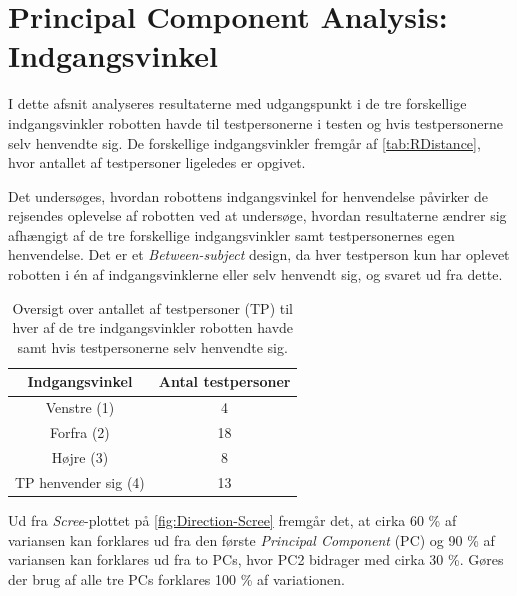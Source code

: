 \section{Principal Component Analysis: Indgangsvinkel}
\label{DatabehandlingRIndgangsvinkel}
%
I dette afsnit analyseres resultaterne med udgangspunkt i de tre forskellige indgangsvinkler robotten havde til testpersonerne i testen og hvis testpersonerne selv henvendte sig. De forskellige indgangsvinkler fremgår af \autoref{tab:RDistance}, hvor antallet af testpersoner ligeledes er opgivet. 

Det undersøges, hvordan robottens indgangsvinkel for henvendelse påvirker de rejsendes oplevelse af robotten ved at undersøge, hvordan resultaterne ændrer sig afhængigt af de tre forskellige indgangsvinkler samt testpersonernes egen henvendelse. Det er et \textit{Between-subject} design, da hver testperson kun har oplevet robotten i én af indgangsvinklerne eller selv henvendt sig, og svaret ud fra dette.
%
\begin{table}[H]
\centering
\begin{tabular}{c|c}
Indgangsvinkel & Antal testpersoner \\ \hline
Venstre (1) & 4    \\ \hline
Forfra (2) & 18    \\ \hline
Højre (3) & 8     \\ \hline
TP henvender sig (4) & 13 \\
\end{tabular}
\caption{Oversigt over antallet af testpersoner (TP) til hver af de tre indgangsvinkler robotten havde samt hvis testpersonerne selv henvendte sig.}
\label{tab:RDirection}
\end{table}
\noindent
%
Ud fra \textit{Scree}-plottet på \autoref{fig:Direction-Scree} fremgår det, at cirka 60 \% af variansen kan forklares ud fra den første \textit{Principal Component} (PC) og 90 \% af variansen kan forklares ud fra to PCs, hvor PC2 bidrager med cirka 30 \%. Gøres der brug af alle tre PCs forklares 100 \% af variationen. 
%
